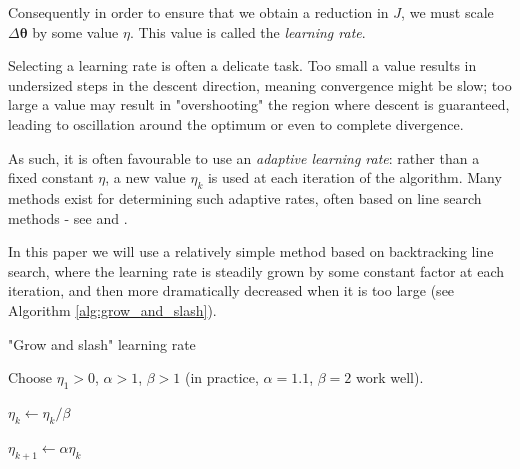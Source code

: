 \documentclass{article}[11pt]
\begin{document}
            Consequently in order to ensure that we obtain a reduction in $J$, we must scale $\Delta \boldsymbol{\theta}$ by some value $\eta$. This value is called the \textit{learning rate}.
            
            Selecting a learning rate is often a delicate task. Too small a value results in undersized steps in the descent direction, meaning convergence might be slow; too large a value may result in "overshooting" the region where descent is guaranteed, leading to oscillation around the optimum or even to complete divergence.
            
            As such, it is often favourable to use an \textit{adaptive learning rate}: rather than a fixed constant $\eta$, a new value $\eta_k$ is used at each iteration of the algorithm. Many methods exist for determining such adaptive rates, often based on line search methods - see \cite{line_search} and \cite{adam}.
            
            In this paper we will use a relatively simple method based on backtracking line search, where the learning rate is steadily grown by some constant factor at each iteration, and then more dramatically decreased when it is too large (see Algorithm \ref{alg:grow_and_slash}).
            
            
            \begin{algorithm}
                
                \caption{"Grow and slash" learning rate}
                
                \begin{algorithmic}
                
                    \State Choose $\eta_1 > 0$, $\alpha > 1$, $\beta > 1$ (in practice, $\alpha = 1.1$, $\beta = 2$ work well).
                    
                            \State $\eta_k \gets \eta_k / \beta$
                        \EndWhile
                        
                        \State $\eta_{k+1} \gets \alpha \eta_k$
                    \EndFor
                    
                \end{algorithmic}
            
                \label{alg:grow_and_slash}
                
            \end{algorithm}
            
\end{document}
